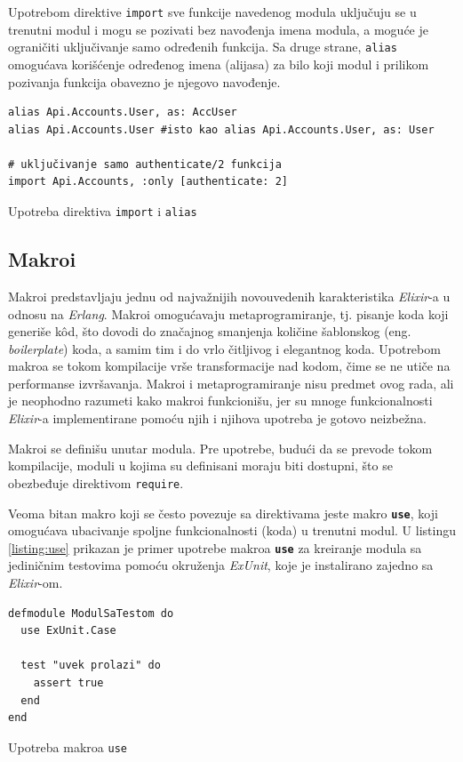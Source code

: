 \documentclass[12pt,oneside]{memoir}
\begin{document}
Upotrebom direktive \texttt{import} sve funkcije navedenog modula uključuju se u trenutni
modul i mogu se pozivati bez navođenja imena modula, a moguće je ograničiti uključivanje samo
određenih funkcija. Sa druge strane, \texttt{alias} omogućava korišćenje određenog imena
(alijasa) za bilo koji modul i prilikom pozivanja funkcija obavezno je njegovo navođenje.
\begin{listing}[h]
\begin{verbatim}
alias Api.Accounts.User, as: AccUser
alias Api.Accounts.User #isto kao alias Api.Accounts.User, as: User

# uključivanje samo authenticate/2 funkcija 
import Api.Accounts, :only [authenticate: 2] 
\end{verbatim}
\caption{Upotreba direktiva \texttt{import} i \texttt{alias}}
\label{listing:elixirAliasImport}
\end{listing}

\subsection{Makroi}
Makroi predstavljaju jednu od najvažnijih novouvedenih karakteristika \emph{Elixir}-a u odnosu na \emph{Erlang}.
Makroi omogućavaju metaprogramiranje, tj. pisanje koda koji generiše k\^{o}d, što dovodi do 
značajnog smanjenja količine šablonskog (eng. \emph{boilerplate}) koda, a samim tim i do
vrlo čitljivog i elegantnog koda. Upotrebom makroa se tokom kompilacije vrše transformacije
nad kodom, čime se ne utiče na performanse izvršavanja. Makroi i metaprogramiranje nisu predmet
ovog rada, ali je neophodno razumeti kako makroi funkcionišu, jer su mnoge funkcionalnosti
\emph{Elixir}-a implementirane pomoću njih i njihova upotreba je gotovo neizbežna. 

Makroi se definišu unutar modula. Pre upotrebe, budući da se prevode tokom kompilacije, moduli
u kojima su definisani moraju biti dostupni, što se obezbeđuje direktivom \texttt{require}. 

Veoma bitan makro koji se često povezuje sa direktivama jeste makro \texttt{\textbf{use}},
koji omogućava ubacivanje spoljne funkcionalnosti (koda) u trenutni modul. U listingu 
\ref{listing:use} prikazan je primer upotrebe makroa \texttt{\textbf{use}} za kreiranje modula
sa jediničnim testovima pomoću okruženja \emph{ExUnit}, koje je instalirano zajedno sa \emph{Elixir}-om.
\begin{listing}[h]
\begin{verbatim}
defmodule ModulSaTestom do
  use ExUnit.Case

  test "uvek prolazi" do
    assert true
  end
end
\end{verbatim}
\caption{Upotreba makroa \texttt{use}}
\label{listing:use}
\end{listing}
  
\end{document}
